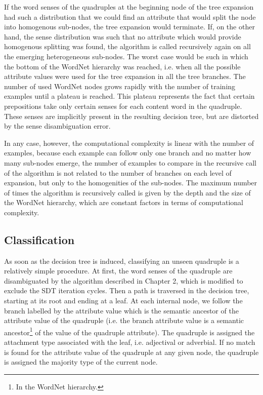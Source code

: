 If the word senses of the quadruples at the beginning node of the tree expansion had such a distribution that we could find an attribute that would split the node into homogenous sub-nodes, the tree expansion would terminate. If, on the other hand, the sense distribution was such that no attribute which would provide homogenous splitting was found, the algorithm is called recursively again on all the emerging heterogeneous sub-nodes. The worst case would be such in which the bottom of the WordNet hierarchy was reached, i.e. when all the possible attribute values were used for the tree expansion in all the tree branches. The number of used WordNet nodes grows rapidly with the number of training examples until a plateau is reached. This plateau represents the fact that certain prepositions take only certain senses for each content word in the quadruple. These senses are implicitly present in the resulting decision tree, but are distorted by the sense disambiguation error.

In any case, however, the computational complexity is linear with the number of examples, because each example can follow only one branch and no matter how many sub-nodes emerge, the number of examples to compare in the recursive call of the algorithm is not related to the number of branches on each level of expansion, but only to the homogenities of the sub-nodes. The maximum number of times the algorithm is recursively called is given by the depth and the size of the WordNet hierarchy, which are constant factors in terms of computational complexity.

\subsection{Classification}

As soon as the decision tree is induced, classifying an unseen quadruple is a relatively simple procedure. At first, the word senses of the quadruple are disambiguated by the algorithm described in Chapter 2, which is modified to exclude the SDT iteration cycles. Then a path is traversed in the decision tree, starting at its root and ending at a leaf. At each internal node, we follow the branch labelled by the attribute value which is the semantic ancestor of the attribute value of the quadruple (i.e. the branch attribute value is a semantic ancestor\footnote{In the WordNet hierarchy.} of the value of the quadruple attribute). The quadruple is assigned the attachment type associated with the leaf, i.e. adjectival or adverbial. If no match is found for the attribute value of the quadruple at any given node, the quadruple is assigned the majority type of the current node.

